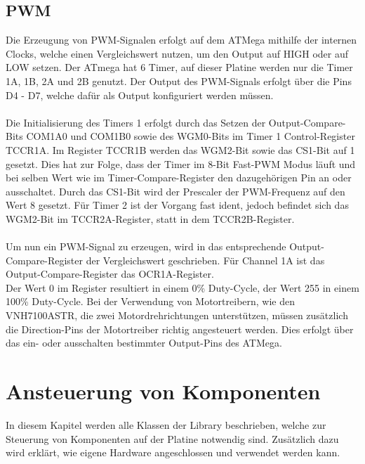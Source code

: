 \documentclass[12pt]{article}
\begin{document}
\subsection{PWM}
Die Erzeugung von PWM-Signalen erfolgt auf dem ATMega mithilfe der internen Clocks, welche einen Vergleichswert nutzen, um den Output auf HIGH oder auf LOW setzen. Der ATmega hat 6 Timer, auf dieser Platine werden nur die Timer 1A, 1B, 2A und 2B genutzt. Der Output des PWM-Signals erfolgt über die Pins D4 - D7, welche dafür als Output konfiguriert werden müssen.
\\\\Die Initialisierung des Timers 1 erfolgt durch das Setzen der Output-Compare-Bits COM1A0 und COM1B0 sowie des WGM0-Bits im Timer 1 Control-Register TCCR1A. Im Register TCCR1B werden das WGM2-Bit sowie das CS1-Bit auf 1 gesetzt. Dies hat zur Folge, dass der Timer im 8-Bit Fast-PWM Modus läuft und bei selben Wert wie im Timer-Compare-Register den dazugehörigen Pin an oder ausschaltet. Durch das CS1-Bit wird der Prescaler der PWM-Frequenz auf den Wert 8 gesetzt. Für Timer 2 ist der Vorgang fast ident, jedoch befindet sich das WGM2-Bit im TCCR2A-Register, statt in dem TCCR2B-Register.
\\\\Um nun ein PWM-Signal zu erzeugen, wird in das entsprechende Output-Compare-Register der Vergleichswert geschrieben. Für Channel 1A ist das Output-Compare-Register das OCR1A-Register.\\
Der Wert 0 im Register resultiert in einem 0\% Duty-Cycle, der Wert 255 in einem 100\% Duty-Cycle. Bei der Verwendung von Motortreibern, wie den VNH7100ASTR, die zwei Motordrehrichtungen unterstützen, müssen zusätzlich die Direction-Pins der Motortreiber richtig angesteuert werden. Dies erfolgt über das ein- oder ausschalten bestimmter Output-Pins des ATMega.
\newpage\section{Ansteuerung von Komponenten}
In diesem Kapitel werden alle Klassen der Library beschrieben, welche zur Steuerung von Komponenten auf der Platine notwendig sind. Zusätzlich dazu wird erklärt, wie eigene Hardware angeschlossen und verwendet werden kann.
\end{document}
